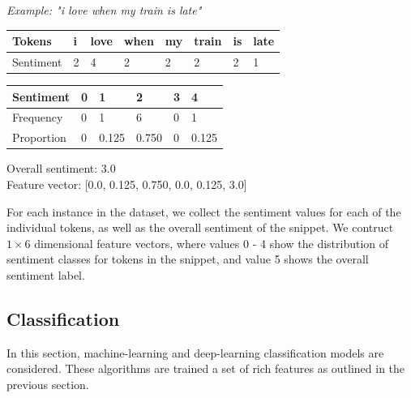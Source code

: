 \documentclass[12pt,a4paper]{article}
\begin{document}
\hspace{-15pt}\begin{minipage}{0.55\textwidth}
	\textit{Example: "i love when my train is late"}\vspace{-15pt}
	\begin{center}	
		\begin{tabular}{|m{1.8cm}||m{0.4cm}m{0.6cm}m{0.75cm}m{0.4cm}m{0.7cm}m{0.2cm}m{0.6cm}|}
			\hline 
			\textbf{Tokens} & \textbf{i} & \textbf{love} & \textbf{when} & \textbf{my} & \textbf{train} & \textbf{is} & \textbf{late}\\ 
			\hline 
			Sentiment & 2 & 4 & 2 & 2 & 2 & 2 & 1\\ 
			\hline 
		\end{tabular}
		\vspace{5pt}
		
		\begin{tabular}{|p{1.8cm}||p{0.9cm}|p{0.9cm}|p{0.9cm}|p{0.9cm}|p{0.9cm}|} 
			\hline 
			\textbf{Sentiment} & \textbf{0} & \textbf{1} & \textbf{2} & \textbf{3} & \textbf{4}\\ 
			\hline 
			Frequency & 0 & 1 & 6 & 0 & 1\\ 
			Proportion & 0 & 0.125 & 0.750 & 0 & 0.125\\
			\hline  
		\end{tabular}
	\end{center}
	Overall sentiment: 3.0\\
	Feature vector: [0.0, 0.125, 0.750, 0.0, 0.125, 3.0]\\
\end{minipage}
\hspace{15pt}\begin{minipage}{0.4\textwidth}
	\vspace{-5pt}
	For each instance in the dataset, we collect the sentiment values for each of the individual tokens, as well as the overall sentiment of the snippet. We contruct $ 1 \times 6 $ dimensional feature vectors, where values 0 - 4 show the distribution of sentiment classes for tokens in the snippet, and value 5 shows the overall sentiment label.\\
\end{minipage}



\subsection{Classification}
\noindent 
In this section, machine-learning and deep-learning classification models are considered. These algorithms are trained a set of rich features as outlined in the previous section.
\end{document}
